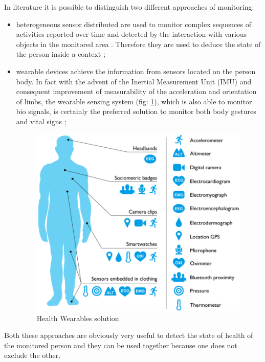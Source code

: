 \documentclass{thesisreport}
\begin{document}
 In literature it is possible to distinguish two different approaches of monitoring: 
 \begin{itemize}
    \item heterogeneous sensor distributed are used to monitor complex sequences of activities reported over time and detected by the interaction with various objects in the monitored area \cite{scalmato2012describing}. Therefore they are used to deduce the state of the person inside a context \cite{aggarwal2011human};
    \item wearable devices achieve the information from sensors located on the person body. In fact with the advent of the Inertial Measurement Unit (IMU) and consequent improvement of measurability of the acceleration and orientation of limbs, the wearable sensing system (fig: \ref{fig:Wearables}), which is also able to monitor bio signals, is certainly the preferred solution to monitor both body gestures and vital signs \cite{bruno2013analysis};
 
    \begin{figure}
		\centering
		\includegraphics[width=10.5cm]{Thesis/data/sensoring.png}
		\caption{Health Wearables solution \cite{Wearables2016rise}}
		\label{fig:Wearables}
	\end{figure}
	
\end{itemize}
Both these approaches are obviously very useful to detect the state of health of the monitored person and they can be used together because one does not exclude the other. 
\end{document}
